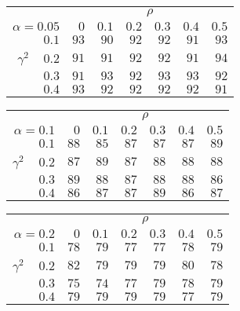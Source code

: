 \begin{tabular}{r|rrrrrr}
\hline\hline
 &\multicolumn{6}{c}{$\rho$} \\ 
 $\alpha = 0.05$ & $0$ & $0.1$ & $0.2$ & $0.3$ & $0.4$ & $0.5$ \\ 
 \hline$0.1$ & $93$ & $90$ & $92$ & $92$ & $91$ & $93$\\ 
$\gamma^2\;\;\;$ $0.2$ & $91$ & $91$ & $92$ & $92$ & $91$ & $94$\\ 
$0.3$ & $91$ & $93$ & $92$ & $93$ & $93$ & $92$\\ 
$0.4$ & $93$ & $92$ & $92$ & $92$ & $92$ & $91$\\ 
 \hline 
 \end{tabular}
 
 \vspace{2em} 
 
\begin{tabular}{r|rrrrrr}
\hline\hline
 &\multicolumn{6}{c}{$\rho$} \\ 
 $\alpha = 0.1$ & $0$ & $0.1$ & $0.2$ & $0.3$ & $0.4$ & $0.5$ \\ 
 \hline$0.1$ & $88$ & $85$ & $87$ & $87$ & $87$ & $89$\\ 
$\gamma^2\;\;\;$ $0.2$ & $87$ & $89$ & $87$ & $88$ & $88$ & $88$\\ 
$0.3$ & $89$ & $88$ & $87$ & $88$ & $88$ & $86$\\ 
$0.4$ & $86$ & $87$ & $87$ & $89$ & $86$ & $87$\\ 
 \hline 
 \end{tabular}
 
 \vspace{2em} 
 
\begin{tabular}{r|rrrrrr}
\hline\hline
 &\multicolumn{6}{c}{$\rho$} \\ 
 $\alpha = 0.2$ & $0$ & $0.1$ & $0.2$ & $0.3$ & $0.4$ & $0.5$ \\ 
 \hline$0.1$ & $78$ & $79$ & $77$ & $77$ & $78$ & $79$\\ 
$\gamma^2\;\;\;$ $0.2$ & $82$ & $79$ & $79$ & $79$ & $80$ & $78$\\ 
$0.3$ & $75$ & $74$ & $77$ & $79$ & $78$ & $79$\\ 
$0.4$ & $79$ & $79$ & $79$ & $79$ & $77$ & $79$\\ 
 \hline 
 \end{tabular}
